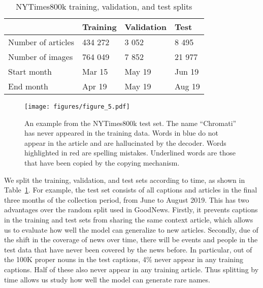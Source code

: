 \begin{table}[t]
	\caption {NYTimes800k training, validation, and test splits}
	\label{tab:splits}
	\centering
	\begin{tabularx}{\linewidth}{lXXX}
		\toprule
		  & Training  &   Validation & Test \\
		\midrule
      Number of articles & 434 272 & 3 052 & 8 495 \\
      Number of images  & 764 049 & 7 852 & 21 977 \\
      Start month & Mar 15 & May 19 & Jun 19 \\
      End month & Apr 19 & May 19 & Aug 19 \\
		\bottomrule
	\end{tabularx}
\end{table}

\begin{figure*}[t]
   \begin{center}
		\texttt{[image: figures/figure\_5.pdf]}
	\end{center}
   \caption{An example from the NYTimes800k test set. The name ``Chromati'' has
   never appeared in the training data. Words in blue do not appear in the
   article and are hallucinated by the decoder. Words highlighted in red are
   spelling mistakes. Underlined words are those that have been copied by the
   copying mechanism.}
   \label{fig:short}
\end{figure*}


We split the training, validation, and test sets according to time, as shown in
Table~\ref{tab:splits}. For example, the test set consists of all captions and
articles in the final three months of the collection period, from June to
August 2019. This has two advantages over the random split used in GoodNews.
Firstly, it prevents captions in the training and test sets from sharing the
same context article, which allows us to evaluate how well the model can
generalize to new articles. Secondly, due of the shift in the coverage of news
over time, there
will be events and people in the test data that have never been covered by the
news
before. In particular, out of the 100K proper nouns in the test captions, 4\%
never appear in any training captions. Half of these also never appear in any
training article. Thus splitting by time allows us study how well the model can
generate rare names.
